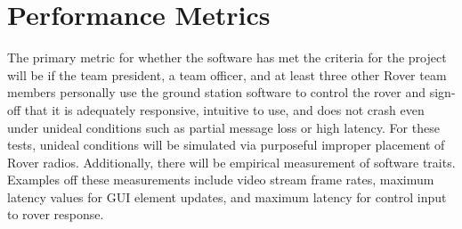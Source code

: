 \documentclass[onecolumn, draftclsnofoot, 10pt, compsoc]{IEEEtran}
\begin{document}
\section{Performance Metrics}
The primary metric for whether the software has met the criteria for the project will be if the team president, a team officer, and at least three other Rover team members personally use the ground station software to control the rover and sign-off that it is adequately responsive, intuitive to use, and does not crash even under unideal conditions such as partial message loss or high latency. 
For these tests, unideal conditions will be simulated via purposeful improper placement of Rover radios.
Additionally, there will be empirical measurement of software traits. 
Examples off these measurements include video stream frame rates, maximum latency values for GUI element updates, and maximum latency for control input to rover response.
\end{document}
